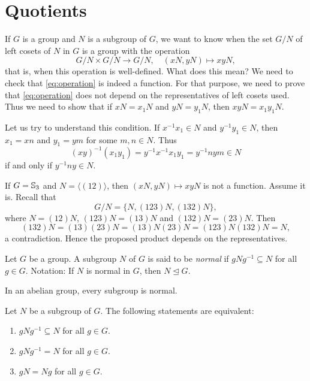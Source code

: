 \section{Quotients}
\lecture\label{lec:quotients}

If $G$ is a group and $N$ is a subgroup of $G$, we want to know
when the set $G/N$ of left cosets 
of $N$ in $G$ is a group with 
the operation 
\begin{equation}
\label{eq:operation}
G/N\times G/N\to G/N,\quad 
(xN,yN)\mapsto xyN,
\end{equation}
that is, when this operation 
is well-defined. 
What does this mean? We need to check that
\eqref{eq:operation} is indeed a function. 
For that purpose, we need to prove that
\eqref{eq:operation} does not depend on the representatives of left
cosets used. Thus we need to show that if 
$xN=x_1N$ and $yN=y_1N$, then 
$xyN=x_1y_1N$. 

Let us try to understand this condition. If $x^{-1}x_1\in N$ and 
$y^{-1}y_1\in N$, then $x_1=xn$ and $y_1=ym$ for some 
$m,n\in N$. Thus 
\[
(xy)^{-1}(x_1y_1)=y^{-1}x^{-1}x_1y_1=y^{-1}nym\in N
\]
if and only if $y^{-1}ny\in N$.

\begin{example}
If $G=\mathbb{S}_3$ and $N=\langle (12)\rangle$, then $(xN,yN)\mapsto xyN$ is not a function. Assume it is. Recall that 
\[
G/N=\{N,(123)N,(132)N\},
\]
where 
$N=(12)N$, $(123)N=(13)N$ and $(132)N=(23)N$. Then 
\[
(132)N=(13)(23)N=(13)N(23)N=(123)N(132)N=N,
\]
a contradiction. Hence 
the proposed product depends on the representatives.
\end{example}

\begin{definition}
    Let $G$ be a group. 
    A subgroup $N$ of $G$ is said to be \emph{normal} if $gNg^{-1}\subseteq N$ for all $g\in G$.
    Notation: If $N$ is normal in $G$, then $N\unlhd G$.
\end{definition}

In an abelian group, every subgroup is normal. 

\begin{proposition}
\label{pro:normalidad}
Let $N$ be a subgroup of $G$. 
The following statements are equivalent:
\begin{enumerate}
        \item $gNg^{-1}\subseteq N$ for all $g\in G$.
        \item $gNg^{-1}=N$ for all $g\in G$.
        \item $gN=Ng$ for all $g\in G$.
\end{enumerate}
\end{proposition}

